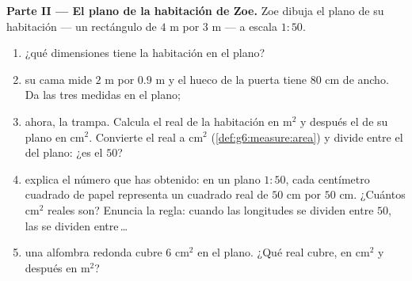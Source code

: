 \begin{problem}
\medskip
\noindent\textbf{Parte II --- El plano de la habitación de Zoe.}
Zoe dibuja el plano de su habitación --- un rectángulo de $4$ m por
$3$ m --- a escala $1:50$.
\begin{enumerate}[resume]
  \item ¿qué dimensiones tiene la habitación en el plano?
  \item su cama mide $2$ m por $0.9$ m y el hueco de la puerta tiene
        $80$ cm de ancho. Da las tres medidas en el plano;
  \item ahora, la trampa. Calcula el  real de la habitación en
        m$^2$ y después el  de su plano en cm$^2$. Convierte el
         real a cm$^2$
        (\cref{def:g6:measure:area}) y divide entre el 
        del plano: ¿es el  $50$?
  \item explica el número que has obtenido: en un plano $1:50$, cada
        centímetro cuadrado de papel representa un cuadrado real de
        $50$ cm por $50$ cm. ¿Cuántos cm$^2$ reales son? Enuncia
        la regla: cuando las longitudes se dividen entre $50$, las  se
        dividen entre\,\dots
  \item una alfombra redonda cubre $6$ cm$^2$ en el plano. ¿Qué 
        real cubre, en cm$^2$ y después en m$^2$?
\end{enumerate}


\end{problem}
